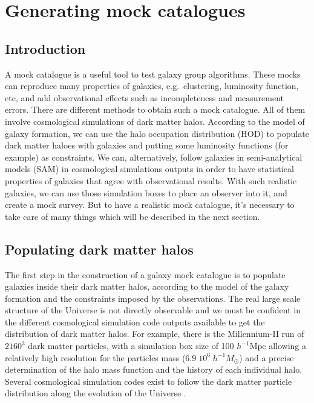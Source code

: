 \chapter{Generating mock catalogues}
\label{cha:mock}

\minitoc%

\section{Introduction}

A mock catalogue is a useful tool to test galaxy group algorithms. These mocks
can reproduce many properties of galaxies, e.g.\ clustering, luminosity
function, etc, and add observational effects such as incompleteness and
measurement errors. There are different methods to obtain such a mock
catalogue. All of them involve cosmological simulations of dark matter halos.
According to the model of galaxy formation, we can use the halo occupation
distribution (HOD) to populate dark matter haloes with galaxies and putting
some luminosity functions (for example) as constraints. We can, alternatively,
follow galaxies in semi-analytical models (SAM) in cosmological simulations
outputs in order to have statistical properties of galaxies that agree with
observational results. With such realistic galaxies, we can use those
simulation boxes to place an observer into it, and create a mock survey. But to
have a realistic mock catalogue, it's necessary to take care of many things
which will be described in the next section.

\section{Populating dark matter halos}
\label{sec:populating_dark_matter_halos}

The first step in the construction of a galaxy mock catalogue is to populate
galaxies inside their dark matter halos, according to the model of the galaxy
formation and the constraints imposed by the observations. The real large scale
structure of the Universe is not directly observable and we must be confident
in the different cosmological simulation code outputs available to get the
distribution of dark matter halos. For example, there is the Millennium-II run
\citep{BoylanKolchin+09} of $2160^3$ dark matter particles, with a simulation
box size of 100 $h^{-1} \mathrm{Mpc}$ allowing a relatively high resolution for
the particles mass ($6.9\;10^6\;h^{-1} M_\odot$) and a precise determination of
the halo mass function and the history of each individual halo. Several
cosmological simulation codes exist to follow the dark matter particle
distribution along the evolution of the Universe \citep{Springel+01,
Teyssier+02, Springel+05}.

